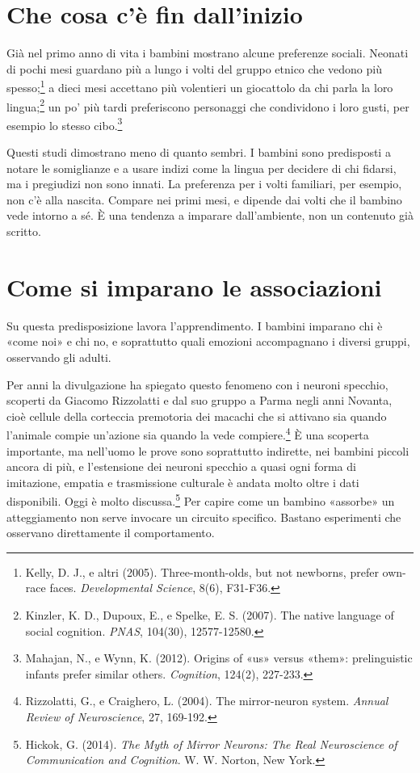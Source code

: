 \section{Che cosa c'è fin dall'inizio}

Già nel primo anno di vita i bambini mostrano alcune preferenze sociali. Neonati di pochi mesi guardano più a lungo i volti del gruppo etnico che vedono più spesso;\footnote{Kelly, D. J., e altri (2005). Three-month-olds, but not newborns, prefer own-race faces. \textit{Developmental Science}, 8(6), F31-F36.} a dieci mesi accettano più volentieri un giocattolo da chi parla la loro lingua;\footnote{Kinzler, K. D., Dupoux, E., e Spelke, E. S. (2007). The native language of social cognition. \textit{PNAS}, 104(30), 12577-12580.} un po' più tardi preferiscono personaggi che condividono i loro gusti, per esempio lo stesso cibo.\footnote{Mahajan, N., e Wynn, K. (2012). Origins of «us» versus «them»: prelinguistic infants prefer similar others. \textit{Cognition}, 124(2), 227-233.}

Questi studi dimostrano meno di quanto sembri. I bambini sono predisposti a notare le somiglianze e a usare indizi come la lingua per decidere di chi fidarsi, ma i pregiudizi non sono innati. La preferenza per i volti familiari, per esempio, non c'è alla nascita. Compare nei primi mesi, e dipende dai volti che il bambino vede intorno a sé. È una tendenza a imparare dall'ambiente, non un contenuto già scritto.

\section{Come si imparano le associazioni}

Su questa predisposizione lavora l'apprendimento. I bambini imparano chi è «come noi» e chi no, e soprattutto quali emozioni accompagnano i diversi gruppi, osservando gli adulti.

Per anni la divulgazione ha spiegato questo fenomeno con i neuroni specchio, scoperti da Giacomo Rizzolatti e dal suo gruppo a Parma negli anni Novanta, cioè cellule della corteccia premotoria dei macachi che si attivano sia quando l'animale compie un'azione sia quando la vede compiere.\footnote{Rizzolatti, G., e Craighero, L. (2004). The mirror-neuron system. \textit{Annual Review of Neuroscience}, 27, 169-192.} È una scoperta importante, ma nell'uomo le prove sono soprattutto indirette, nei bambini piccoli ancora di più, e l'estensione dei neuroni specchio a quasi ogni forma di imitazione, empatia e trasmissione culturale è andata molto oltre i dati disponibili. Oggi è molto discussa.\footnote{Hickok, G. (2014). \textit{The Myth of Mirror Neurons: The Real Neuroscience of Communication and Cognition}. W. W. Norton, New York.} Per capire come un bambino «assorbe» un atteggiamento non serve invocare un circuito specifico. Bastano esperimenti che osservano direttamente il comportamento.

